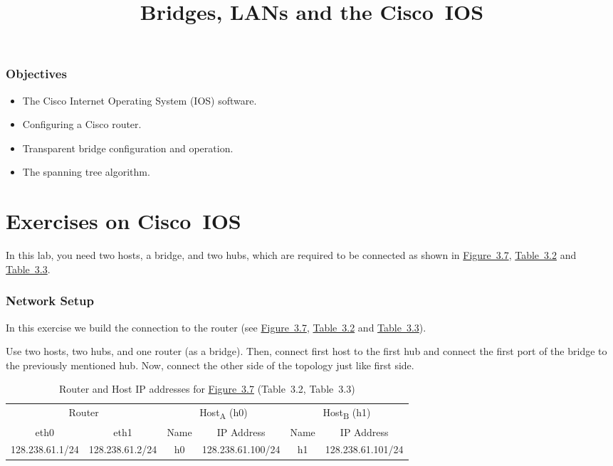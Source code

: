 \documentclass{../UTNetLab}
\title{Bridges, LANs and the Cisco~IOS}
\begin{document}
\section*{Objectives}
\begin{itemize}
    \item The Cisco Internet Operating System (IOS) software.
    \item Configuring a Cisco router.
    \item Transparent bridge configuration and operation.
    \item The spanning tree algorithm.
\end{itemize}

\part{Exercises on Cisco~IOS}
In this lab, you need two hosts, a bridge, and two hubs, which are required to be connected as shown in \hyperref[fig:3.7]{Figure~3.7}, \hyperref[tab:3.2]{Table~3.2} and \hyperref[tab:3.3]{Table~3.3}.

\section{Network Setup}
In this exercise we build the connection to the router (see \hyperref[fig:3.7]{Figure~3.7}, \hyperref[tab:3.2]{Table~3.2} and \hyperref[tab:3.3]{Table~3.3}).

Use two hosts, two hubs, and one router (as a bridge).
Then, connect first host to the first hub and connect the first port of the bridge to the previously mentioned hub.
Now, connect the other side of the topology just like first side.

\begin{table}[H]
    \caption{Router and Host IP addresses for \hyperref[fig:3.7]{Figure~3.7} (Table~3.2\label{tab:3.2}, Table~3.3\label{tab:3.3})}
    \centering
    \begin{tabular}{ *2c|*2c|*2c }
        \hline \hline
        \multicolumn{2}{c|}{Router} & \multicolumn{2}{c|}{Host\textsubscript{A} (h0)} & \multicolumn{2}{c}{Host\textsubscript{B} (h1)}                                                \\
        eth0                        & eth1                                            & Name                                           & IP Address        & Name & IP Address        \\
        \hline
        128.238.61.1/24             & 128.238.61.2/24                                 & h0                                             & 128.238.61.100/24 & h1   & 128.238.61.101/24 \\
        \hline \hline
    \end{tabular}
\end{table}
\end{document}
